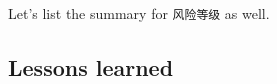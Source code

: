 \documentclass[11pt,letterpaper,english,final]{article}
\begin{document}

{\color{cyan}Let's list the summary for \texttt{风险等级} as well.}

\newpage
\subsection{Lessons learned}
\end{document}
